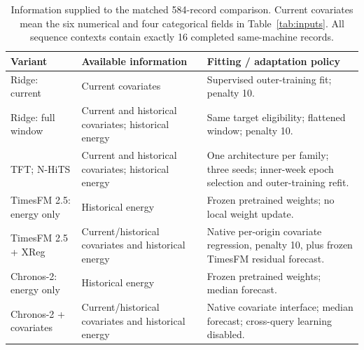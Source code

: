 \begin{table}[!htbp]\centering\small
\caption{Information supplied to the matched 584-record comparison. Current covariates mean the six numerical and four categorical fields in Table~\ref{tab:inputs}. All sequence contexts contain exactly 16 completed same-machine records.}\label{tab:models}
\begin{tabularx}{\linewidth}{@{}p{.25\linewidth}XX@{}}\toprule
Variant & Available information & Fitting / adaptation policy \\\midrule
Ridge: current & Current covariates & Supervised outer-training fit; penalty 10. \\
Ridge: full window & Current and historical covariates; historical energy & Same target eligibility; flattened window; penalty 10. \\
TFT; N-HiTS & Current and historical covariates; historical energy & One architecture per family; three seeds; inner-week epoch selection and outer-training refit. \\
TimesFM 2.5: energy only & Historical energy & Frozen pretrained weights; no local weight update. \\
TimesFM 2.5 + XReg & Current/historical covariates and historical energy & Native per-origin covariate regression, penalty 10, plus frozen TimesFM residual forecast. \\
Chronos-2: energy only & Historical energy & Frozen pretrained weights; median forecast. \\
Chronos-2 + covariates & Current/historical covariates and historical energy & Native covariate interface; median forecast; cross-query learning disabled. \\\bottomrule
\end{tabularx}\end{table}
